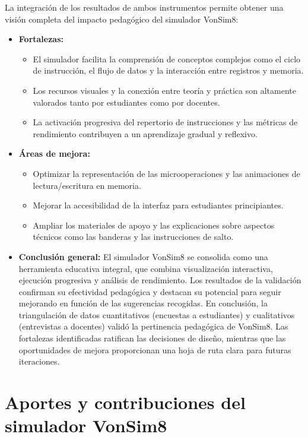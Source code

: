 \documentclass[12pt,oneside]{templates/unerthesis}
\providecommand{\tightlist}{%
  \setlength{\itemsep}{0pt}\setlength{\parskip}{0pt}}
\begin{document}
La integración de los resultados de ambos instrumentos permite obtener una visión completa del impacto pedagógico del simulador VonSim8:

\begin{itemize}
\tightlist
\item
  \textbf{Fortalezas:}

  \begin{itemize}
  \tightlist
  \item
    El simulador facilita la comprensión de conceptos complejos como el ciclo de instrucción, el flujo de datos y la interacción entre registros y memoria.
  \item
    Los recursos visuales y la conexión entre teoría y práctica son altamente valorados tanto por estudiantes como por docentes.
  \item
    La activación progresiva del repertorio de instrucciones y las métricas de rendimiento contribuyen a un aprendizaje gradual y reflexivo.
  \end{itemize}
\item
  \textbf{Áreas de mejora:}

  \begin{itemize}
  \tightlist
  \item
    Optimizar la representación de las microoperaciones y las animaciones de lectura/escritura en memoria.
  \item
    Mejorar la accesibilidad de la interfaz para estudiantes principiantes.
  \item
    Ampliar los materiales de apoyo y las explicaciones sobre aspectos técnicos como las banderas y las instrucciones de salto.
  \end{itemize}
\item
  \textbf{Conclusión general:}
  El simulador VonSim8 se consolida como una herramienta educativa integral, que combina visualización interactiva, ejecución progresiva y análisis de rendimiento. Los resultados de la validación confirman su efectividad pedagógica y destacan su potencial para seguir mejorando en función de las sugerencias recogidas. En conclusión, la triangulación de datos cuantitativos (encuestas a estudiantes) y cualitativos (entrevistas a docentes) validó la pertinencia pedagógica de VonSim8. Las fortalezas identificadas ratifican las decisiones de diseño, mientras que las oportunidades de mejora proporcionan una hoja de ruta clara para futuras iteraciones.
\end{itemize}

\hypertarget{aportes-y-contribuciones-del-simulador-vonsim8}{%
\section{Aportes y contribuciones del simulador VonSim8}\label{aportes-y-contribuciones-del-simulador-vonsim8}}
\end{document}
